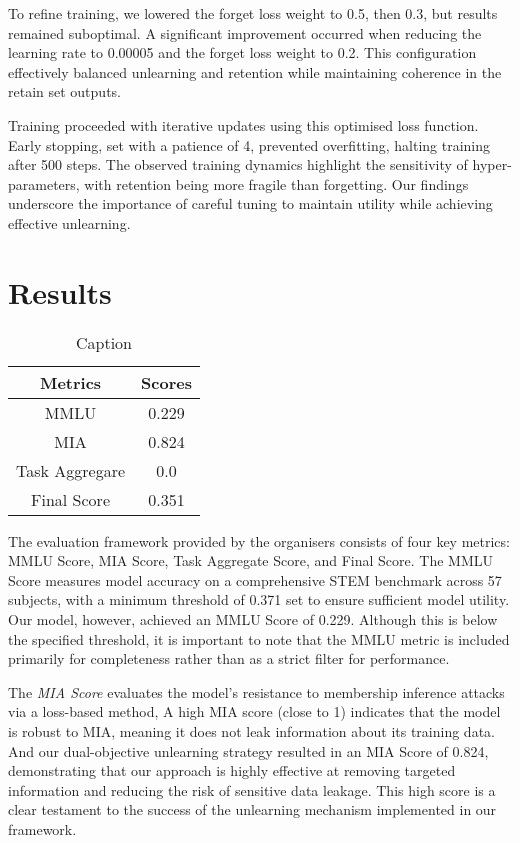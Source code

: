 \documentclass[11pt]{article}
\begin{document}
To refine training, we lowered the forget loss weight to 0.5, then 0.3, but results remained suboptimal. A significant improvement occurred when reducing the learning rate to 0.00005 and the forget loss weight to 0.2. This configuration effectively balanced unlearning and retention while maintaining coherence in the retain set outputs.

Training proceeded with iterative updates using this optimised loss function. Early stopping, set with a patience of 4, prevented overfitting, halting training after 500 steps. The observed training dynamics highlight the sensitivity of hyper-parameters, with retention being more fragile than forgetting. Our findings underscore the importance of careful tuning to maintain utility while achieving effective unlearning.

\section{Results}

\begin{table}[h]
    \centering
    \begin{tabular}{c|c}
        \hline
        \textbf{Metrics} & \textbf{Scores} \\
        \hline
       MMLU   & 0.229 \\
       MIA & 0.824 \\
       Task Aggregare & 0.0 \\
       Final Score & 0.351 \\
       \hline
    \end{tabular}
    \caption{Caption}
    \label{tab:final_score}
\end{table}

The evaluation framework provided by the organisers consists of four key metrics: MMLU Score, MIA Score, Task Aggregate Score, and Final Score. The MMLU Score measures model accuracy on a comprehensive STEM benchmark across 57 subjects, with a minimum threshold of 0.371 set to ensure sufficient model utility. Our model, however, achieved an MMLU Score of 0.229. Although this is below the specified threshold, it is important to note that the MMLU metric is included primarily for completeness rather than as a strict filter for performance.

The \textit{MIA Score} evaluates the model’s resistance to membership inference attacks via a loss-based method, A high MIA score (close to 1) indicates that the model is robust to MIA, meaning it does not leak information about its training data. And our dual-objective unlearning strategy resulted in an MIA Score of 0.824, demonstrating that our approach is highly effective at removing targeted information and reducing the risk of sensitive data leakage. This high score is a clear testament to the success of the unlearning mechanism implemented in our framework.
\end{document}
